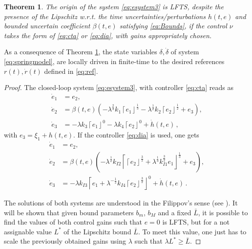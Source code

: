 \documentclass[journal,twoside,web]{ieeecolor}
\newcommand{\Sabs}[1]{\left\lceil #1 \right\rfloor}
\newtheorem{theorem}{Theorem}
\begin{document}
\begin{theorem}
The origin of the system \eqref{eq:esystem3} is LFTS, despite the presence of the Lipschitz w.r.t. the time uncertainties/perturbations $h(t,e)$ and bounded uncertain coefficient $\beta(t,e)$ satisfying \eqref{eq:Bounds}, if the control $\nu$ takes the form of \eqref{eq:cta} or \eqref{eq:dia}, with gains appropriately chosen. 
\label{th:sliding}
\end{theorem}

As a consequence of Theorem \ref{th:sliding}, the state variables $\delta,\dot{\delta}$ of system \eqref{eq:springmodel}, are locally driven in finite-time to the desired references $r(t),\dot{r}(t)$ defined in \eqref{eq:ref}.

\begin{proof}
The closed-loop system \eqref{eq:esystem3}, with controller \eqref{eq:cta} reads as
\begin{equation}
\begin{split}
\dot{e}_1 &= e_2, \\
\dot{e}_2 &= \beta(t,e) \left(- \lambda^{\frac{2}{3}} k_1\Sabs{e_1}^{\frac{1}{3}}- \lambda^{\frac{1}{2}} k_2\Sabs{e_2}^{\frac{1}{2}} + e_{3}\right),\\
\dot{e}_{3} &= - \lambda k_3\Sabs{e_1}^{0}- \lambda k_4\Sabs{e_2}^{0} + \dot{h}(t,e) \,,
\label{eq:clsystem1}
\end{split}
\end{equation}
with $e_3 = \xi_1 + h(t,e)$. If the controller \eqref{eq:dia} is used, one gets
\begin{equation}
\begin{split}
\dot{e}_1 &= e_2, \\
\dot{e}_2 &= \beta(t,e) \left(- \lambda^{\frac{1}{2}} k_{I2}\Sabs{\Sabs{e_2}^{\frac{3}{2}} + \lambda^{\frac{1}{3}} k_{I1}^{\frac{3}{2}} e_1}^{\frac{1}{3}} + e_{3}\right),\\
\dot{e}_{3} &= - \lambda k_{I3} \Sabs{e_1 + \lambda^{-\frac{1}{2}} k_{I4} \Sabs{e_2}^{\frac{3}{2}}}^{0} + \dot{h}(t,e) \,.
\label{eq:clsystem2}
\end{split}
\end{equation}

The solutions of both systems are understood in the Filippov's sense (see \cite{b:filippov}). It will be shown that given bound parameters $b_{m}$, $b_{M}$ and a fixed $\bar{L}$, it is possible to find the values of both control gains such that $e=0$ is LFTS, but for a not assignable value $L^{*}$ of the Lipschitz bound $\bar{L}$. To meet this value, one just has to scale the previously obtained gains using $\lambda$ such that $\lambda L^{*}\geq \bar{L}$. 


\end{proof}
\end{document}
